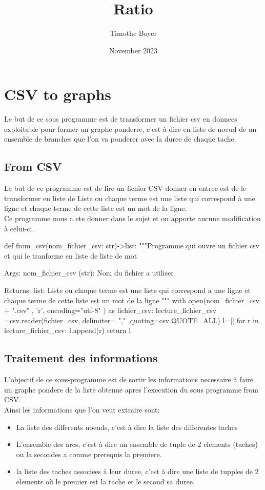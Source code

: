 \documentclass{article}
\title{Ratio}
\author{Timothe Boyer}
\date{November 2023}
\begin{document}
\maketitle

\section{CSV to graphs}
Le but de ce sous programme est de transformer un fichier csv en donnees exploitable pour former un graphe ponderre, c'est à dire en liste de noeud de un ensemble de branches que l'on va ponderer avec la duree de chaque tache.

\subsection{From CSV}
Le but de ce programme est de lire un fichier CSV donner en entree est de le transformer en liste de Liste ou chaque terme est une liste qui correspond à une ligne et chaque terme de cette liste est un mot de la ligne.
\\
Ce programme nous a ete donner dans le sujet et on apporte aucune modification à celui-ci.
\begin{python}
def from_csv(nom_fichier_csv: str)->list:
    """Programme qui ouvre un fichier csv et qui le tranforme en liste de liste de mot

    Args:
        nom_fichier_csv (str): Nom du fichier a utiliser

    Returns:
        list: Liste ou chaque terme est une liste qui correspond a une ligne et chaque terme de cette liste est un mot de la ligne
    """
    with open(nom_fichier_csv + ".csv" , 'r', encoding="utf-8" ) as fichier_csv:
        lecture_fichier_csv =csv.reader(fichier_csv, delimiter= "," ,quoting=csv.QUOTE_ALL)
        l=[]
        for r in lecture_fichier_csv:
            l.append(r)
        return l
\end{python}


\subsection{Traitement des informations}
L'objectif de ce sous-programme est de sortir les informations necessaire à faire un graphe pondere de la liste obtenue apres l'execution du sous programme from CSV.
\\
Ainsi les informations que l'on veut extraire sont:
\begin{itemize}
    \item La liste des differents noeuds, c'est à dire la liste des differentes taches
    \item L'ensemble des arcs, c'est à dire un ensemble de tuple de 2 elements (taches) ou la secondes a comme prerequis la premiere.
    \item la liste des taches associees à leur duree, c'est à dire une liste de tupples de 2 elements où le premier est la tache et le second sa duree.
\end{itemize}
\end{document}
